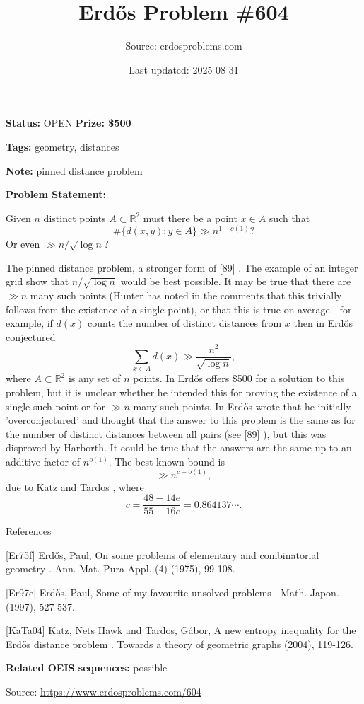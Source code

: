 \documentclass{article}
\title{Erd\H{o}s Problem \#604}
\date{Last updated: 2025-08-31}
\author{Source: erdosproblems.com}
\begin{document}
\maketitle

\noindent\textbf{Status:} OPEN \quad \textbf{Prize: \$500}

\noindent\textbf{Tags:} geometry, distances

\medskip
\noindent\textbf{Note:} pinned distance problem

\medskip

\noindent\textbf{Problem Statement:}

Given $n$ distinct points $A\subset\mathbb{R}^2$ must there be a point $x\in A$ such that\[\#\{ d(x,y) : y \in A\} \gg n^{1-o(1)}?\]Or even $\gg n/\sqrt{\log n}$?




The pinned distance problem, a stronger form of [89] . The example of an integer grid show that $n/\sqrt{\log n}$ would be best possible. It may be true that there are $\gg n$ many such points (Hunter has noted in the comments that this trivially follows from the existence of a single point), or that this is true on average - for example, if $d(x)$ counts the number of distinct distances from $x$ then in \cite{Er75f} Erd\H{o}s conjectured\[\sum_{x\in A}d(x) \gg \frac{n^2}{\sqrt{\log n}},\]where $A\subset \mathbb{R}^2$ is any set of $n$ points. In \cite{Er97e} Erd\H{o}s offers \$500 for a solution to this problem, but it is unclear whether he intended this for proving the existence of a single such point or for $\gg n$ many such points. In \cite{Er97e} Erd\H{o}s wrote that he initially 'overconjectured' and thought that the answer to this problem is the same as for the number of distinct distances between all pairs (see [89] ), but this was disproved by Harborth. It could be true that the answers are the same up to an additive factor of $n^{o(1)}$. The best known bound is\[\gg n^{c-o(1)},\]due to Katz and Tardos \cite{KaTa04}, where\[c=\frac{48-14e}{55-16e}=0.864137\cdots.\]




References

[Er75f] Erd\H{o}s, Paul, On some problems of elementary and combinatorial geometry . Ann. Mat. Pura Appl. (4) (1975), 99-108.

[Er97e] Erd\H{o}s, Paul, Some of my favourite unsolved problems . Math. Japon. (1997), 527-537.

[KaTa04] Katz, Nets Hawk and Tardos, G\'{a}bor, A new entropy inequality for the Erd\H{o}s distance problem . Towards a theory of geometric graphs (2004), 119-126.

\noindent\textbf{Related OEIS sequences:} possible


\bigskip
\noindent\small{Source: \url{https://www.erdosproblems.com/604}}
\end{document}
